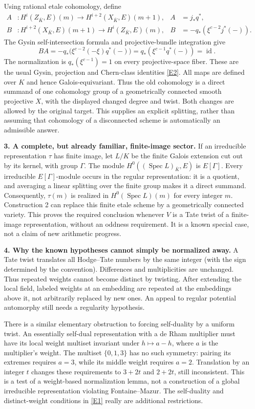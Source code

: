 \documentclass[11pt,a4paper]{article}
\newcommand{\eref}[2]{\hyperlink{extra:#1:#2}{[E#2]}}
\numberwithin{equation}{section}
\begin{document}
Using rational etale cohomology, define
\begin{align*}
 A &: H^i(Z_{\bar K},E)(m)\longrightarrow
          H^{i+2}(X_{\bar K},E)(m+1),& A&=j_*q^*,\\
 B &: H^{i+2}(X_{\bar K},E)(m+1)\longrightarrow
          H^i(Z_{\bar K},E)(m),& B&=-q_*(\xi^{c-2}j^*(-)).
\end{align*}
The Gysin self-intersection formula and projective-bundle integration give
\[
 BA=-q_*\bigl(\xi^{c-2}(-\xi)q^*(-)\bigr)
     =q_*(\xi^{c-1}q^*(-))=\operatorname{id}.
\]
The normalization is $q_*(\xi^{c-1})=1$ on every projective-space fiber.
These are the usual Gysin, projection and Chern-class identities
\eref{9400048}{2}. All maps are defined over $K$ and hence Galois-equivariant.
Thus the old cohomology is a direct summand of one cohomology group of a
geometrically connected smooth projective $X$, with the displayed changed
degree and twist. Both changes are allowed by the original target.
This supplies an explicit splitting, rather than assuming that cohomology
of a disconnected scheme is automatically an admissible answer.

\textbf{3. A complete, but already familiar, finite-image sector.}
If an irreducible representation $\tau$ has finite image, let $L/K$ be the
finite Galois extension cut out by its kernel, with group $\Gamma$.
The module $H^0((\operatorname{Spec}L)_{\bar K},E)$ is $E[\Gamma]$.
Every irreducible $E[\Gamma]$-module occurs in the regular representation:
it is a quotient, and averaging a linear splitting over the finite group
makes it a direct summand. Consequently, $\tau(m)$ is realized in
$H^0(\operatorname{Spec}L)(m)$ for every integer $m$. Construction 2 can
replace this finite etale scheme by a geometrically connected variety.
This proves the required conclusion whenever $V$ is a Tate twist of a
finite-image representation, without an oddness requirement. It is a known
special case, not a claim of new arithmetic progress.

\textbf{4. Why the known hypotheses cannot simply be normalized away.}
A Tate twist translates all Hodge--Tate numbers by the same integer
(with the sign determined by the convention). Differences and multiplicities
are unchanged. Thus repeated weights cannot become distinct by twisting.
After extending the local field, labeled weights at an embedding are
repeated at the embeddings above it, not arbitrarily replaced by new ones.
An appeal to regular potential automorphy still needs a regularity hypothesis.

There is a similar elementary obstruction to forcing self-duality by a
uniform twist. An essentially self-dual representation with a de Rham
multiplier must have its local weight multiset invariant under
$h\mapsto a-h$, where $a$ is the multiplier's weight. The multiset
$\{0,1,3\}$ has no such symmetry: pairing its extremes requires $a=3$,
while its middle weight requires $a=2$. Translation by an integer $t$
changes these requirements to $3+2t$ and $2+2t$, still inconsistent.
This is a test of a weight-based normalization lemma, not a construction of
a global irreducible representation violating Fontaine--Mazur. The
self-duality and distinct-weight conditions in \eref{9400048}{1} really are
additional restrictions.
\end{document}
